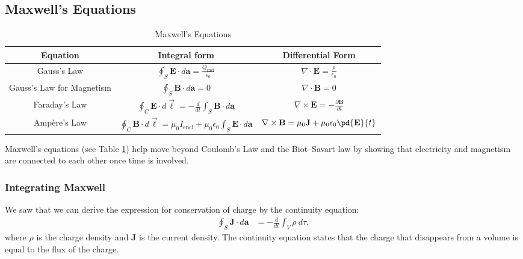 \documentclass[10pt]{mypackage}
\begin{document}
\subsection{Maxwell's Equations}%
\begin{table}
  \centering
  \renewcommand{\arraystretch}{2}
  \begin{tabular}{c|c|c}
    Equation & Integral form & Differential Form\\
    \hline\hline
    Gauss's Law & $\displaystyle \oint_{S}\mathbf{E}\cdot d\mathbf{a} = \frac{Q_{\text{encl}}}{\epsilon_0}$& $\displaystyle \nabla \cdot \mathbf{E} = \frac{\rho}{\epsilon_0}$\\
    Gauss's Law for Magnetism & $\displaystyle \oint_{S} \mathbf{B}\cdot d\mathbf{a} = 0$ & $\displaystyle \nabla \cdot \mathbf{B} = 0$\\
    Faraday's Law & $\displaystyle \oint_{C}\mathbf{E}\cdot d\vec{\ell} = -\frac{d}{dt}\int_{S}\mathbf{B}\cdot d\mathbf{a}$ &  $\displaystyle \nabla \times \mathbf{E} = -\frac{\partial \mathbf{B}}{\partial t}$\\
    Ampère's Law & $\displaystyle \oint_{C} \mathbf{B}\cdot d\vec{\ell} = \mu_{0}I_{\text{encl}} + \mu_{0}\epsilon_0\int_{S}\mathbf{E}\cdot d\mathbf{a}$ &  $\displaystyle \nabla \times \mathbf{B} = \mu_0\mathbf{J} + \mu_0\epsilon_0\pd{\mathbf{E}}{t}$\\
  \end{tabular}
  \caption{Maxwell's Equations}
  \label{table:maxwell}
\end{table}
\begin{table}
  
\end{table}
Maxwell's equations (see Table \ref{table:maxwell}) help move beyond Coulomb's Law and the Biot--Savart law by showing that electricity and magnetism are connected to each other once time is involved. 
\subsubsection{Integrating Maxwell}%
We saw that we can derive the expression for conservation of charge by the continuity equation:
\begin{align*}
  \oint_{S}\mathbf{J}\cdot d\mathbf{a} &= -\frac{d}{dt}\int_{V}\rho\:d\tau,
\end{align*}
where $\rho$ is the charge density and $\mathbf{J}$ is the current density. The continuity equation states that the charge that disappears from a volume is equal to the flux of the charge.\newline
\end{document}
